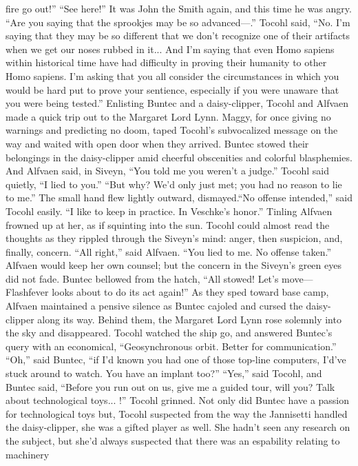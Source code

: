 \documentclass[9pt]{article}
\begin{document}
fire go out!”
“See here!” It was John the Smith again, and this time he was angry. “Are you saying that the
sprookjes may be so advanced—.”
Tocohl said, “No. I’m saying that they may be so different that we don’t recognize one of their
artifacts when we get our noses rubbed in it... And I’m saying that even Homo sapiens within historical
time have had difficulty in proving their humanity to other Homo sapiens. I’m asking that you all consider
the circumstances in which you would be hard put to prove your sentience, especially if you were
unaware that you were being tested.”
Enlisting Buntec and a daisy-clipper, Tocohl and Alfvaen made a quick trip out to the Margaret
Lord Lynn. Maggy, for once giving no warnings and predicting no doom, taped Tocohl’s subvocalized
message on the way and waited with open door when they arrived.
Buntec stowed their belongings in the daisy-clipper amid cheerful obscenities and colorful
blasphemies. And Alfvaen said, in Siveyn, “You told me you weren’t a judge.”
Tocohl said quietly, “I lied to you.”
“But why? We’d only just met; you had no reason to lie to me.” The small hand flew lightly outward,
dismayed.“No offense intended,” said Tocohl easily. “I like to keep in practice. In Veschke’s honor.”
Tinling Alfvaen frowned up at her, as if squinting into the sun. Tocohl could almost read the thoughts
as they rippled through the Siveyn’s mind: anger, then suspicion, and, finally, concern.
“All right,” said Alfvaen. “You lied to me. No offense taken.”
Alfvaen would keep her own counsel; but the concern in the Siveyn’s green eyes did not fade.
Buntec bellowed from the hatch, “All stowed! Let’s move—Flashfever looks about to do its act
again!”
As they sped toward base camp, Alfvaen maintained a pensive silence as Buntec cajoled and cursed
the daisy-clipper along its way.
Behind them, the Margaret Lord Lynn rose solemnly into the sky and disappeared. Tocohl watched
the ship go, and answered Buntec’s query with an economical, “Geosynchronous orbit. Better for
communication.”
“Oh,” said Buntec, “if I’d known you had one of those top-line computers, I’d’ve stuck around to
watch. You have an implant too?”
“Yes,” said Tocohl, and Buntec said, “Before you run out on us, give me a guided tour, will you?
Talk about technological toys... !”
Tocohl grinned. Not only did Buntec have a passion for technological toys but, Tocohl suspected
from the way the Jannisetti handled the daisy-clipper, she was a gifted player as well. She hadn’t seen
any research on the subject, but she’d always suspected that there was an espability relating to machinery
\end{document}
